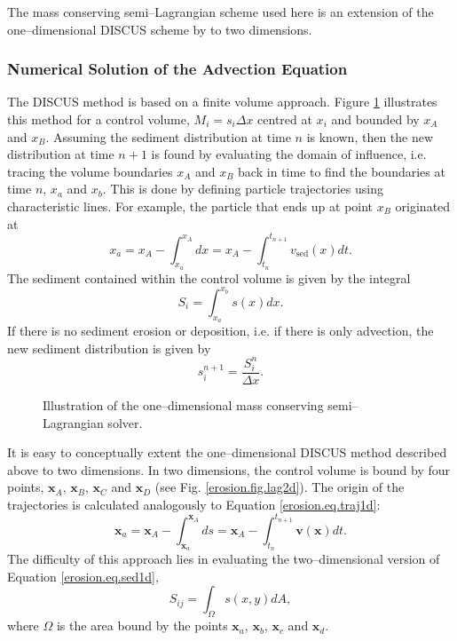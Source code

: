 The mass conserving semi--Lagrangian scheme used here is an extension of the one--dimensional DISCUS scheme by \citet{Manson2000,Manson1999} to two dimensions.

\subsubsection{Numerical Solution of the Advection Equation}
The DISCUS method is based on a finite volume approach. Figure \ref{erosion.fig.lag1d} illustrates this method for a control volume, $M_i=s_i\Delta x$ centred at $x_i$ and bounded by $x_A$ and $x_B$. Assuming the sediment distribution at time $n$ is known, then the new distribution at time $n+1$ is found by evaluating the domain of influence, i.e. tracing the volume boundaries $x_A$ and $x_B$ back in time to find the boundaries at time $n$, $x_a$ and $x_b$. This is done by defining particle trajectories using characteristic lines. For example, the particle that ends up at point $x_B$ originated at
\begin{equation}
  \label{erosion.eq.traj1d}
  x_a=x_A-\int^{x_A}_{x_a}dx=x_A-\int^{t_{n+1}}_{t_n}v_{\text{sed}}(x)dt.
\end{equation}
The sediment contained within the control volume is given by the integral
\begin{equation}
  \label{erosion.eq.sed1d}
  S_i=\int_{x_a}^{x_b}s(x)dx.
\end{equation}
If there is no sediment erosion or deposition, i.e. if there is only advection,
the new sediment distribution is given by
\begin{equation}
  s_i^{n+1}=\frac{S_i^n}{\Delta x}.
\end{equation}

\begin{figure}[htbp]
  \centering
  
  \caption{Illustration of the one--dimensional mass conserving semi--Lagrangian solver.}
  \label{erosion.fig.lag1d}
\end{figure}

It is easy to conceptually extent the one--dimensional DISCUS method described above to two dimensions. In two dimensions, the control volume is bound by four points, $\mathbf{x}_A$,  $\mathbf{x}_B$, $\mathbf{x}_C$ and $\mathbf{x}_D$ (see Fig. \ref{erosion.fig.lag2d}). The origin of the trajectories is calculated analogously to Equation \eqref{erosion.eq.traj1d}:
\begin{equation}
  \mathbf{x}_a=\mathbf{x}_A-\int^{\mathbf{x}_A}_{\mathbf{x}_a}ds=\mathbf{x}_A-\int^{t_{n+1}}_{t_n}\mathbf{v}(\mathbf{x})dt.
\end{equation}
The difficulty of this approach lies in evaluating the two--dimensional version of Equation \eqref{erosion.eq.sed1d},
\begin{equation}
  \label{erosion.eq.sed2d}
  S_{ij}=\int_\Omega s(x,y)dA,
\end{equation}
where $\Omega$ is the area bound by the points $\mathbf{x}_a$,  $\mathbf{x}_b$, $\mathbf{x}_c$ and $\mathbf{x}_d$.

